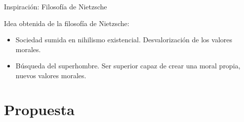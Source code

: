 \documentclass{beamer}
\begin{document}
\begin{frame}{Inspiración: Filosofía de Nietzsche}
\begin{minipage}{0.3\textwidth}
\begin{figure}
    	\end{figure}
    	
    \end{minipage}
    \hfill
	\begin{minipage}{0.65\textwidth}	
    	Idea obtenida de la filosofía de Nietzsche:
    
    	\begin{itemize}
			\item Sociedad sumida en nihilismo existencial. Desvalorización de los valores morales.
			\item Búsqueda del superhombre. Ser superior capaz de crear una moral propia, nuevos valores morales.
    	\end{itemize}
	\end{minipage}
	
\end{frame}
  
  
  
\section{Propuesta}
  
\end{document}
